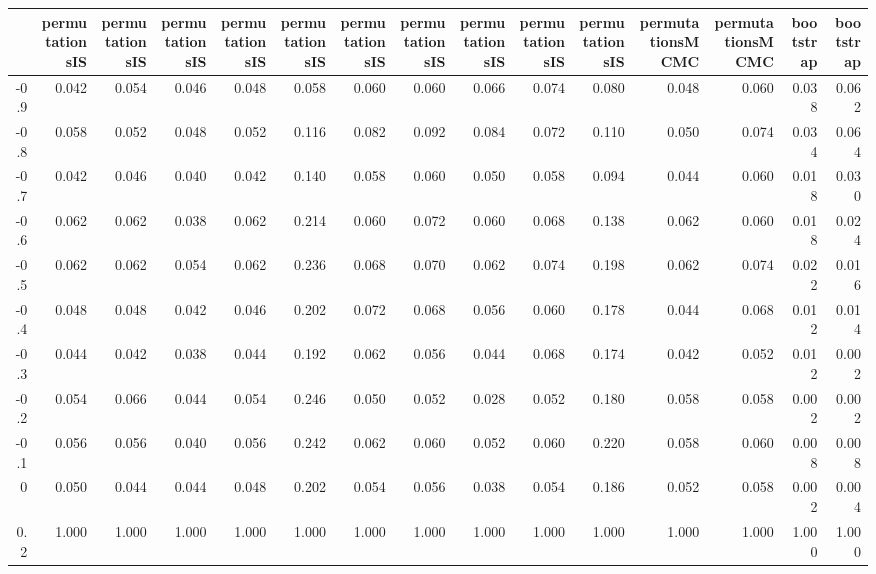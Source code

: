 \begin{table}[ht]
\centering
\begingroup\tiny
\begin{tabular}{rrrrrrrrrrrrrrr}
  \hline
 & permutationsIS & permutationsIS & permutationsIS & permutationsIS & permutationsIS & permutationsIS & permutationsIS & permutationsIS & permutationsIS & permutationsIS & permutationsMCMC & permutationsMCMC & bootstrap & bootstrap \\ 
  \hline
-0.9 & 0.042 & 0.054 & 0.046 & 0.048 & 0.058 & 0.060 & 0.060 & 0.066 & 0.074 & 0.080 & 0.048 & 0.060 & 0.038 & 0.062 \\ 
  -0.8 & 0.058 & 0.052 & 0.048 & 0.052 & 0.116 & 0.082 & 0.092 & 0.084 & 0.072 & 0.110 & 0.050 & 0.074 & 0.034 & 0.064 \\ 
  -0.7 & 0.042 & 0.046 & 0.040 & 0.042 & 0.140 & 0.058 & 0.060 & 0.050 & 0.058 & 0.094 & 0.044 & 0.060 & 0.018 & 0.030 \\ 
  -0.6 & 0.062 & 0.062 & 0.038 & 0.062 & 0.214 & 0.060 & 0.072 & 0.060 & 0.068 & 0.138 & 0.062 & 0.060 & 0.018 & 0.024 \\ 
  -0.5 & 0.062 & 0.062 & 0.054 & 0.062 & 0.236 & 0.068 & 0.070 & 0.062 & 0.074 & 0.198 & 0.062 & 0.074 & 0.022 & 0.016 \\ 
  -0.4 & 0.048 & 0.048 & 0.042 & 0.046 & 0.202 & 0.072 & 0.068 & 0.056 & 0.060 & 0.178 & 0.044 & 0.068 & 0.012 & 0.014 \\ 
  -0.3 & 0.044 & 0.042 & 0.038 & 0.044 & 0.192 & 0.062 & 0.056 & 0.044 & 0.068 & 0.174 & 0.042 & 0.052 & 0.012 & 0.002 \\ 
  -0.2 & 0.054 & 0.066 & 0.044 & 0.054 & 0.246 & 0.050 & 0.052 & 0.028 & 0.052 & 0.180 & 0.058 & 0.058 & 0.002 & 0.002 \\ 
  -0.1 & 0.056 & 0.056 & 0.040 & 0.056 & 0.242 & 0.062 & 0.060 & 0.052 & 0.060 & 0.220 & 0.058 & 0.060 & 0.008 & 0.008 \\ 
  0 & 0.050 & 0.044 & 0.044 & 0.048 & 0.202 & 0.054 & 0.056 & 0.038 & 0.054 & 0.186 & 0.052 & 0.058 & 0.002 & 0.004 \\ 
  0.2 & 1.000 & 1.000 & 1.000 & 1.000 & 1.000 & 1.000 & 1.000 & 1.000 & 1.000 & 1.000 & 1.000 & 1.000 & 1.000 & 1.000 \\ 
   \hline
\end{tabular}
\endgroup
\end{table}
